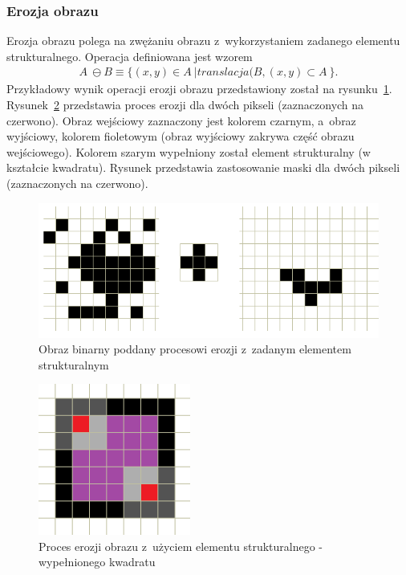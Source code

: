 \subsubsection{Erozja obrazu} 
Erozja obrazu polega na zwężaniu obrazu z~wykorzystaniem zadanego elementu strukturalnego. Operacja definiowana jest wzorem
\begin{gather*}
 A~\ominus B \equiv \{ (x, y) \in A~| translacja(B, (x, y) \subset A~\}.
\end{gather*}
Przykładowy wynik operacji erozji obrazu przedstawiony został na rysunku~\ref{fig:erode}. Rysunek~\ref{fig:erode_better_example} przedstawia proces erozji dla dwóch pikseli (zaznaczonych na czerwono). Obraz wejściowy zaznaczony jest kolorem czarnym, a~obraz wyjściowy, kolorem fioletowym (obraz wyjściowy zakrywa część obrazu wejściowego). Kolorem szarym wypełniony został element strukturalny (w kształcie kwadratu). Rysunek przedstawia zastosowanie maski dla dwóch pikseli (zaznaczonych na czerwono).
\begin{figure}
  \centering
  \includegraphics[width=15cm]{img/erode}
  \caption{Obraz binarny poddany procesowi erozji z~zadanym elementem strukturalnym}
  \label{fig:erode}
\end{figure}
\begin{figure}
  \centering
  \includegraphics[width=5cm]{img/erode-better-example}
  \caption{Proces erozji obrazu z~użyciem elementu strukturalnego - wypełnionego kwadratu}
  \label{fig:erode_better_example}
\end{figure}
